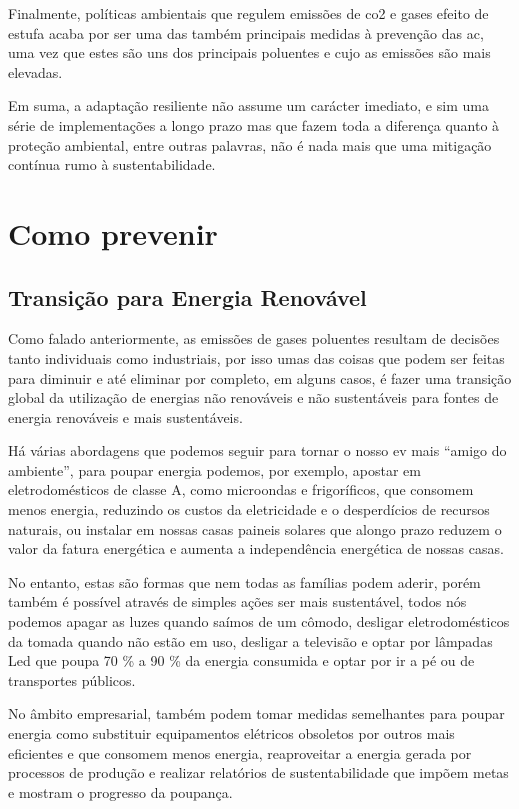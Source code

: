 \documentclass{report}
\begin{document}
Finalmente, políticas ambientais que regulem emissões de \ac{co2} e gases efeito de estufa acaba por ser uma das também principais medidas à prevenção das \ac{ac}, uma vez que estes são uns dos principais poluentes e cujo as emissões são mais elevadas.

Em suma, a adaptação resiliente não assume um carácter imediato, e sim uma série de implementações a longo prazo mas que fazem toda a diferença quanto à proteção ambiental, entre outras palavras, não é nada mais que uma mitigação contínua rumo à sustentabilidade.



\section{Como prevenir}

\subsection{Transição para Energia Renovável}

Como falado anteriormente, as emissões de gases poluentes resultam de decisões tanto individuais como industriais, por isso umas das coisas que podem ser feitas para diminuir e até eliminar por completo, em alguns casos, é fazer uma transição global da utilização de energias não renováveis e não sustentáveis para fontes de energia renováveis e mais sustentáveis.

Há várias abordagens que podemos seguir para tornar o nosso \ac{ev} mais “amigo do ambiente”, para poupar energia podemos, por exemplo, apostar em eletrodomésticos de classe A, como microondas e frigoríficos, que consomem menos energia, reduzindo os custos da eletricidade e o desperdícios de recursos naturais, ou instalar em nossas casas paineis solares que alongo prazo reduzem o valor da fatura energética e aumenta a independência energética de nossas casas.

No entanto, estas são formas que nem todas as famílias podem aderir, porém também é possível através de simples ações ser mais sustentável, todos nós podemos apagar as luzes quando saímos de um cômodo, desligar eletrodomésticos da tomada quando não estão em uso, desligar a televisão e optar por lâmpadas Led que poupa 70 \% a 90 \% da energia consumida e optar por ir a pé ou de transportes públicos.

No âmbito empresarial, também podem tomar medidas semelhantes para poupar energia como substituir equipamentos elétricos obsoletos por outros mais eficientes e que consomem menos energia, reaproveitar a energia gerada por processos de produção e realizar relatórios de sustentabilidade que impõem metas e mostram o progresso da poupança.
\end{document}
